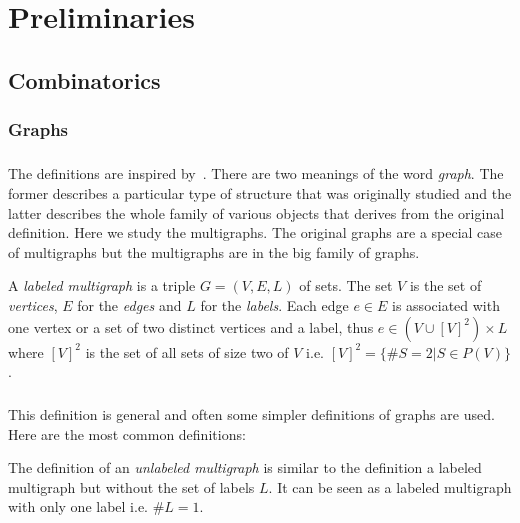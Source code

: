 \chapter{Preliminaries}
\label{Preliminaries}

\section{Combinatorics}
\subsection{Graphs}

\paragraph{}
The definitions are inspired by~\cite{diestel2017graph}. There are two meanings of the word \textit{graph}. The former  describes a particular type of structure that was originally studied and the latter describes the whole family of various objects that derives from the original definition. Here we study the multigraphs. The original graphs are a special case of multigraphs but the multigraphs are in the big family of graphs.

\begin{definition}
  A \textit{labeled multigraph} is a triple $G = (V, E, L)$ of sets. The set $V$ is the set of \textit{vertices}, $E$ for the \textit{edges} and $L$ for the \textit{labels}. Each edge $e \in E$ is associated with one vertex or a set of two distinct vertices and a label, thus $e \in (V \cup [V]^2) \times L$ where $[V]^2$ is the set of all sets of size two of $V$ i.e. $[V]^2 = \{\#S = 2 | S \in P(V)\}$.
\end{definition}

\paragraph{}
This definition is general and often some simpler definitions of graphs are used. Here are the most common definitions:

\begin{definition}
  The definition of an \textit{unlabeled multigraph} is similar to the definition a labeled multigraph but without the set of labels $L$. It can be seen as a labeled multigraph with only one label i.e. $\# L = 1$.
\end{definition}

